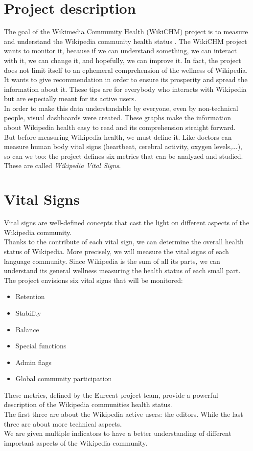 \section{Project description}
\label{sec:project}
The goal of the Wikimedia Community Health (WikiCHM) project is to measure and understand the Wikipedia community health status \cite{consonni}. The WikiCHM project wants to monitor it, because if we can understand something, we can interact with it, we can change it, and hopefully, we can improve it. In fact, the project does not limit itself to an ephemeral comprehension of the wellness of Wikipedia. It wants to give recommendation in order to ensure its prosperity and spread the information about it. These tips are for everybody who interacts with Wikipedia but are especially meant for its active users. \\
In order to make this data understandable by everyone, even by non-technical people, visual dashboards were created. These graphs make the information about Wikipedia health easy to read and its comprehension straight forward.\\
But before measuring Wikipedia health, we must define it.
Like doctors can measure human body vital signs (heartbeat, cerebral activity, oxygen levels,...), so can we too: the project defines six metrics that can be analyzed and studied. These are called \textit{Wikipedia Vital Signs}. \\

\section{Vital Signs}
\label{sec:research}
Vital signs are well-defined concepts that cast the light on different aspects of the Wikipedia community. \\
Thanks to the contribute of each vital sign, we can determine the overall health status of Wikipedia. More precisely, we will measure the vital signs of each language community. Since Wikipedia is the sum of all its parts, we can understand its general wellness measuring the health status of each small part.\\
The project envisions six vital signs that will be monitored:
\pagebreak
\begin{itemize}
    \item Retention
    \item Stability
    \item Balance
    \item Special functions
    \item Admin flags
    \item Global community participation
\end{itemize}
These metrics, defined by the Eurecat project team, provide a powerful description of the Wikipedia communities health status.\\
The first three are about the Wikipedia active users: the editors. While the last three are about more technical aspects. \\
We are given multiple indicators to have a better understanding of different important aspects of the Wikipedia community.\\
